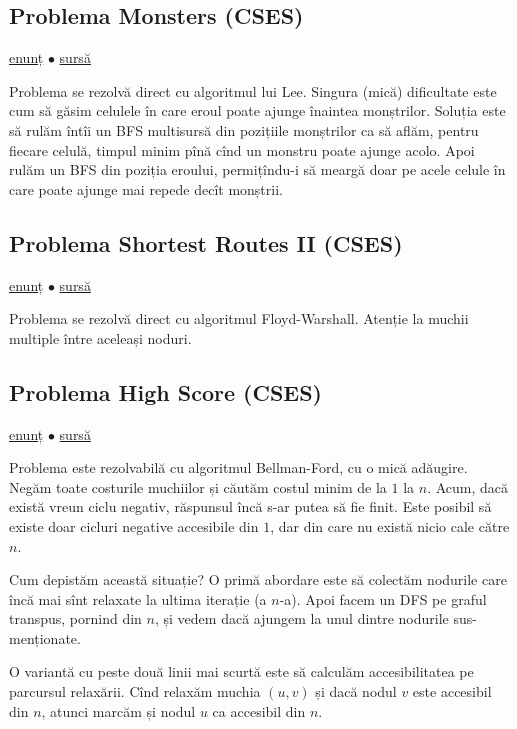 \documentclass[../main.tex]{subfiles}
\begin{document}
\subsection{Problema Monsters (CSES)}
\label{problem:monsters}

\href{https://cses.fi/problemset/task/1194}{enunț}
$\bullet$
\hyperref[code:monsters]{sursă}

Problema se rezolvă direct cu algoritmul lui Lee. Singura (mică) dificultate este cum să găsim celulele în care eroul poate ajunge înaintea monștrilor. Soluția este să rulăm întîi un BFS multisursă din pozițiile monștrilor ca să aflăm, pentru fiecare celulă, timpul minim pînă cînd un monstru poate ajunge acolo. Apoi rulăm un BFS din poziția eroului, permițîndu-i să meargă doar pe acele celule în care poate ajunge mai repede decît monștrii.

\subsection{Problema Shortest Routes II (CSES)}
\label{problem:shortest-routes-2}

\href{https://cses.fi/problemset/task/1672}{enunț}
$\bullet$
\hyperref[code:shortest-routes-2]{sursă}

Problema se rezolvă direct cu algoritmul Floyd-Warshall. Atenție la muchii multiple între aceleași noduri.

\subsection{Problema High Score (CSES)}
\label{problem:high-score}

\href{https://cses.fi/problemset/task/1673}{enunț}
$\bullet$
\hyperref[code:high-score]{sursă}

Problema este rezolvabilă cu algoritmul Bellman-Ford, cu o mică adăugire. Negăm toate costurile muchiilor și căutăm costul minim de la $1$ la $n$. Acum, dacă există vreun ciclu negativ, răspunsul încă s-ar putea să fie finit. Este posibil să existe doar cicluri negative accesibile din $1$, dar din care nu există nicio cale către $n$.

Cum depistăm această situație? O primă abordare este să colectăm nodurile care încă mai sînt relaxate la ultima iterație (a $n$-a). Apoi facem un DFS pe graful transpus, pornind din $n$, și vedem dacă ajungem la unul dintre nodurile sus-menționate.

O variantă cu peste două linii mai scurtă  este să calculăm accesibilitatea pe parcursul relaxării. Cînd relaxăm muchia $(u,v)$ și dacă nodul $v$ este accesibil din $n$, atunci marcăm și nodul $u$ ca accesibil din $n$.
\end{document}
